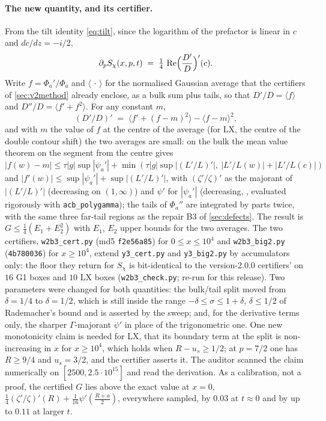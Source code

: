 \documentclass[11pt]{article}
\theoremstyle{definition}
\newcommand{\lean}[1]{\texttt{#1}}
\newcommand{\re}{\operatorname{Re}}
\begin{document}
\paragraph{The new quantity, and its certifier.} From the tilt identity \eqref{eq:tilt}, since the logarithm of the prefactor is linear in $c$ and $dc/dz = -i/2$,
\[
\partial_pS_\chi(x, p, t) \;=\; \tfrac14\,\re\Bigl(\frac{D'}{D}\Bigr)'(c) .
\]
Write $f = \Phi_a'/\Phi_a$ and $\langle\,\cdot\,\rangle$ for the normalised Gaussian average that the certifiers of \cref{sec:v2method} already enclose, as a bulk sum plus tails, so that $D'/D = \langle f\rangle$ and $D''/D = \langle f' + f^2\rangle$. For any constant $m$,
\[
(D'/D)' \;=\; \langle f' + (f - m)^2\rangle - \langle f - m\rangle^2 ,
\]
and with $m$ the value of $f$ at the centre of the average (for LX, the centre of the double contour shift) the two averages are small: on the bulk the mean value theorem on the segment from the centre gives $|f(w) - m| \le \tau|g|\sup|\psi_a'| + \min(\tau|g|\sup|(L'/L)'|,\ |L'/L(w)| + |L'/L(c)|)$ and $|f'(w)| \le \sup|\psi_a'| + \sup|(L'/L)'|$, with $(\zeta'/\zeta)'$ as the majorant of $|(L'/L)'|$ (decreasing on $(1, \infty)$) and $\psi'$ for $|\psi_a'|$ (decreasing, \cite[5.15.1]{DLMF}, evaluated rigorously with \lean{acb\_polygamma}); the tails of $\Phi_a''$ are integrated by parts twice, with the same three far-tail regions as the repair B3 of \cref{sec:defects}. The result is $G \le \tfrac14(E_1 + E_2^2)$ with $E_1$, $E_2$ upper bounds for the two averages. The two certifiers, \lean{w2b3\_cert.py} (md5 \lean{f2e56a85}) for $0 \le x \le 10^4$ and \lean{w2b3\_big2.py} (\lean{4b780036}) for $x \ge 10^4$, extend \lean{y3\_cert.py} and \lean{y3\_big2.py} by accumulators only: the floor they return for $S_\chi$ is bit-identical to the version-2.0.0 certifiers' on $16$ G1 boxes and $10$ LX boxes (\lean{w2b3\_check.py}; re-run for this release). Two parameters were changed for both quantities: the bulk/tail split moved from $\delta = 1/4$ to $\delta = 1/2$, which is still inside the range $-\delta \le \sigma \le 1 + \delta$, $\delta \le 1/2$ of Rademacher's bound \cite[Lemma 5.6]{BMOR2020} and is asserted by the sweep; and, for the derivative terms only, the sharper $\Gamma$-majorant $\psi'$ in place of the trigonometric one. One new monotonicity claim is needed for LX, that its boundary term at the split is non-increasing in $x$ for $x \ge 10^4$, which holds when $R - u_s \ge 1/2$; at $p = 7/2$ one has $R \ge 9/4$ and $u_s = 3/2$, and the certifier asserts it. The auditor scanned the claim numerically on $[2500, 2.5\cdot10^{15}]$ and read the derivation. As a calibration, not a proof, the certified $G$ lies above the exact value at $x = 0$, $\tfrac14(\zeta'/\zeta)'(R) + \tfrac1{16}\psi'(\tfrac{R + a}{2})$, everywhere sampled, by $0.03$ at $t \approx 0$ and by up to $0.11$ at larger $t$.
\end{document}
